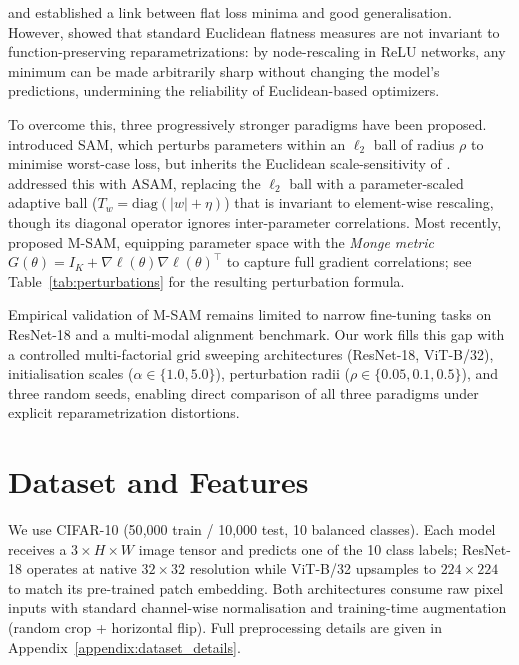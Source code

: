 \documentclass{article}
\begin{document}
\citet{hochreiter1997flat} and \citet{keskar2016large} established a link between flat loss minima and good generalisation. However, \citet{dinh17b} showed that standard Euclidean flatness measures are not invariant to function-preserving reparametrizations: by node-rescaling in ReLU networks, any minimum can be made arbitrarily sharp without changing the model's predictions, undermining the reliability of Euclidean-based optimizers.

To overcome this, three progressively stronger paradigms have been proposed. \citet{foret2021sam} introduced SAM, which perturbs parameters within an $\ell_2$ ball of radius $\rho$ to minimise worst-case loss, but inherits the Euclidean scale-sensitivity of \citet{dinh17b}. \citet{kwon2021asam} addressed this with ASAM, replacing the $\ell_2$ ball with a parameter-scaled adaptive ball ($T_w = \mathrm{diag}(|w|+\eta)$) that is invariant to element-wise rescaling, though its diagonal operator ignores inter-parameter correlations. Most recently, \citet{jacobsen2025msam} proposed M-SAM, equipping parameter space with the \emph{Monge metric} $G(\theta)=I_K+\nabla\ell(\theta)\nabla\ell(\theta)^\top$ to capture full gradient correlations; see Table~\ref{tab:perturbations} for the resulting perturbation formula.

Empirical validation of M-SAM remains limited to narrow fine-tuning tasks on ResNet-18 and a multi-modal alignment benchmark. Our work fills this gap with a controlled multi-factorial grid sweeping architectures (ResNet-18, ViT-B/32), initialisation scales ($\alpha\in\{1.0,5.0\}$), perturbation radii ($\rho\in\{0.05,0.1,0.5\}$), and three random seeds, enabling direct comparison of all three paradigms under explicit reparametrization distortions.


\section{Dataset and Features}

We use CIFAR-10 \citep{Krizhevsky09learningmultiple} (50{,}000 train / 10{,}000 test, 10 balanced classes). Each model receives a $3\times H\times W$ image tensor and predicts one of the 10 class labels; ResNet-18 operates at native $32\times32$ resolution while ViT-B/32 upsamples to $224\times224$ to match its pre-trained patch embedding. Both architectures consume raw pixel inputs with standard channel-wise normalisation and training-time augmentation (random crop + horizontal flip). Full preprocessing details are given in Appendix~\ref{appendix:dataset_details}.
\end{document}
